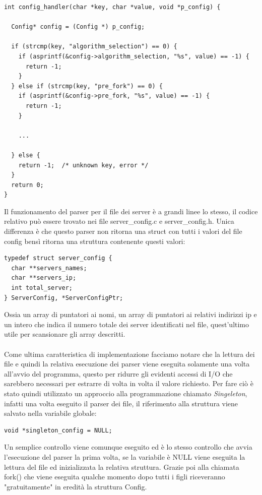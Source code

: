 \documentclass[italian]{tktltiki2}
\begin{document}
\begin{lstlisting}
int config_handler(char *key, char *value, void *p_config) {

  Config* config = (Config *) p_config;
    
  if (strcmp(key, "algorithm_selection") == 0) {
    if (asprintf(&config->algorithm_selection, "%s", value) == -1) {
      return -1;
    }
  } else if (strcmp(key, "pre_fork") == 0) {
    if (asprintf(&config->pre_fork, "%s", value) == -1) {
      return -1;
    }

    ...
          
  } else {
    return -1;  /* unknown key, error */
  }
  return 0;
}
\end{lstlisting}
Il funzionamento del parser per il file dei server è a grandi linee lo stesso, il codice relativo può essere trovato nei file server\_config.c e server\_config.h. Unica differenza è che questo parser non ritorna una struct con tutti i valori del file config bensì ritorna una struttura contenente questi valori:

\begin{lstlisting}
typedef struct server_config {
  char **servers_names;
  char **servers_ip;
  int total_server;
} ServerConfig, *ServerConfigPtr;
\end{lstlisting}
Ossia un array di puntatori ai nomi, un array di puntatori ai relativi indirizzi ip e un intero che indica il numero totale dei server identificati nel file, quest'ultimo utile per scansionare gli array descritti.
\\\\Come ultima caratteristica di implementazione facciamo notare che la lettura dei file e quindi la relativa esecuzione dei parser viene eseguita solamente una volta all'avvio del programma, questo per ridurre gli evidenti accessi di I/O che sarebbero necessari per estrarre di volta in volta il valore richiesto. Per fare ciò è stato quindi utilizzato un approccio alla programmazione chiamato \emph{Singeleton}, infatti una volta eseguito il parser dei file, il riferimento alla struttura viene salvato nella variabile globale:

\begin{lstlisting}
void *singleton_config = NULL;
\end{lstlisting}
Un semplice controllo viene comunque eseguito ed è lo stesso controllo che avvia l'esecuzione del parser la prima volta, se la variabile è NULL viene eseguita la lettura del file ed inizializzata la relativa struttura. Grazie poi alla chiamata fork() che viene eseguita qualche momento dopo tutti i figli riceveranno "gratuitamente" in eredità la struttura Config.
\end{document}
